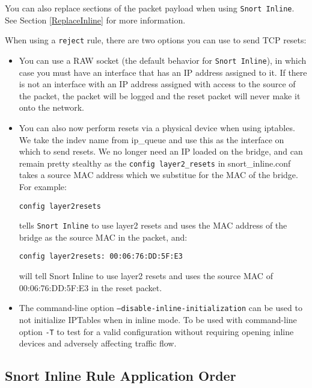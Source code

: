 \documentclass[english]{report}
\newenvironment{note}{
\samepage
    \vspace{10pt}{\textsf{
        {\hspace{7pt}\Huge{$\triangle$\hspace{-12.5pt}{\Large{$^!$}}}}\hspace{5pt}
        {\Large{NOTE}}
    }
    }
   \begin{center}
    \par\vspace{-17pt}

    \begin{lrbox}{\savepar}
    \begin{minipage}[r]{6in}
}
{
    \end{minipage}
    \end{lrbox}
    \fbox{
        \usebox{
            \savepar
	}
    }
    \par\vskip10pt
    \end{center}
}
\begin{document}
\begin{note}
You can also replace sections of the packet payload when using \texttt{Snort Inline}.
See Section \ref{ReplaceInline} for more information.
\end{note}

When using a \texttt{reject} rule, there are two options you can use to send
TCP resets:
\begin{itemize}

\item You can use a RAW socket (the default behavior for \texttt{Snort Inline}), in which case you must have an interface that has an IP address assigned to it. If there is not an interface with an IP address assigned with access to the source of the packet, the packet will be logged and the reset packet will never make it onto the network.

\item You can also now perform resets via a physical device when using iptables.  We take the indev name from ip\_queue and use this as the interface on which to send resets. We no longer need an IP loaded on the bridge, and can remain pretty stealthy as the \texttt{config layer2\_resets} in snort\_inline.conf takes a source MAC address which we substitue for the MAC of the bridge. For example:
\begin{verbatim}
config layer2resets
\end{verbatim}
tells \texttt{Snort Inline} to use layer2 resets and uses the MAC address of the bridge as the source MAC in the packet, and:
\begin{verbatim}
config layer2resets: 00:06:76:DD:5F:E3  
\end{verbatim}
will tell Snort Inline to use layer2 resets and uses the source MAC of 
00:06:76:DD:5F:E3 in the reset packet.

\item The command-line option \texttt{--disable-inline-initialization} can be
used to not initialize IPTables when in inline mode.  To be used with
command-line option \texttt{-T} to test for a valid configuration without
requiring opening inline devices and adversely affecting traffic flow.

\end{itemize}

\subsection{Snort Inline Rule Application Order\label{InlineRuleOrder}}
\end{document}
